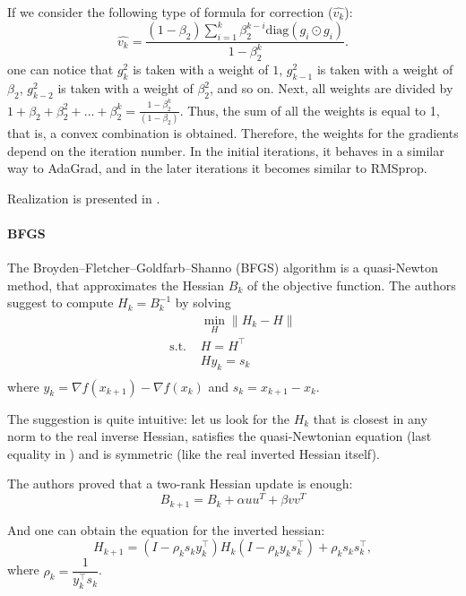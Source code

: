 \documentclass{article}
\begin{document}
If we consider the following type of formula for correction ($\hat{v_k}$):
$$
  \hat{v_k} = \frac{(1-\beta_2)\sum_{i=1}^k \beta_2^{k-i} \text{diag}(g_i \odot g_i)}{1 - \beta_2^k}.
$$
one can notice that $g_k^2$ is taken with a weight of $1$, $g_{k-1}^2$ is taken with a weight of $\beta_2$, $g_{k-2}^2$ is taken with a weight of $\beta_2^2$, and so on.
Next, all weights are divided by $1+\beta_2+\beta_2^2+\dots+\beta_2^k = \frac{1 - \beta_2^k}{(1-\beta_2)}$. Thus, the sum of all the weights is equal to 1, that is, a convex combination is obtained.
Therefore, the weights for the gradients depend on the iteration number. In the initial iterations, it behaves in a similar way to AdaGrad, and in the later iterations it becomes similar to RMSprop.

Realization is presented in .

\paragraph{BFGS}
The Broyden–Fletcher–Goldfarb–Shanno (BFGS) algorithm is a quasi-Newton method, that approximates the Hessian $B_k$ of the objective function. The authors suggest to compute $H_k = B^{-1}_k$ by solving
\begin{equation}\label{eq:bfgs}
  \begin{aligned}
                 & \min_H \| H_k - H \| \\
    \text{s.t. } & H = H^{\top}         \\
                 & H y_k = s_k          \\
  \end{aligned}
\end{equation}
where $y_k = \nabla f(x_{k+1}) - \nabla f(x_k)$ and $s_k = x_{k+1} - x_k$.

The suggestion is quite intuitive: let us look for the $H_k$ that is closest in any norm to the real inverse Hessian, satisfies the quasi-Newtonian equation (last equality in ) and is symmetric (like the real inverted Hessian itself).

The authors proved that a two-rank Hessian update is enough:
\begin{equation*}
  B_{k+1} = B_k + \alpha uu^T + \beta v v^T
\end{equation*}

And one can obtain the equation for the inverted hessian:
\begin{equation*}
  H_{k+1} = (I - \rho_k  s_ky^{\top}_k)H_k(I - \rho_k  y_k s^{\top}_k) +\rho_k  s_k s^{\top}_k,
\end{equation*}
where $\rho_k = \dfrac{1}{y^{\top}_k s_k}$.
\end{document}

